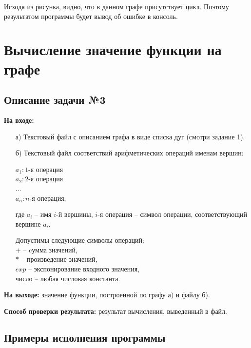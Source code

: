\documentclass[bachelor, och, otchet]{template}
\begin{document}
    Исходя из рисунка, видно, что в данном графе присутствует цикл. Поэтому результатом
    программы будет вывод об ошибке в консоль.


\section{Вычисление значение функции на графе}

    \subsection{Описание задачи №3}

    \textbf{На входе:} 

        \begin{itemize}
            \item[а)] Текстовый файл с описанием графа в виде списка дуг (смотри задание 1).
            \item[б)] Текстовый файл соответствий арифметических операций именам вершин:
            
                \begin{center}
                    $a_1 : 1\text{-я операция}$ \\
                    $a_2 : 2\text{-я операция}$ \\
                    $\dots$ \\
                    $a_n : n\text{-я операция}$, \\
                \end{center}
                где $a_i$ -- имя $i$-й вершины, $i$-я операция -- символ операции, соответствующий вершине $a_i$.
                
                Допустимы следующие символы операций: \\
                $+$ -- cумма значений,\\
                $*$ -- произведение значений,\\
                $exp$ -- экспонирование входного значения,\\
                число -- любая числовая константа.\\		
        \end{itemize}

    \textbf{На выходе:} значение функции, построенной по графу а) и файлу б).

    \textbf{Способ проверки результата:} результат вычисления, выведенный в файл.

    \subsection{Примеры исполнения программы}
    
\end{document}
